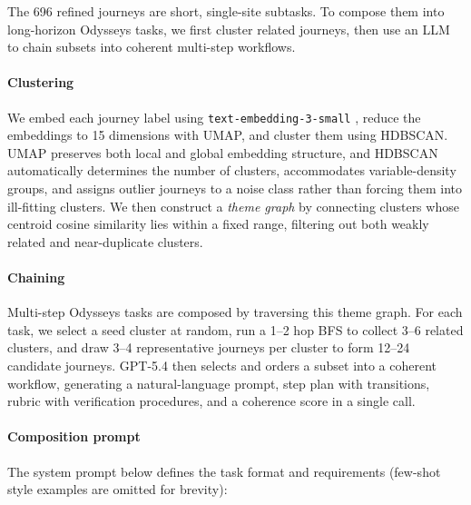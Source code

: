 \documentclass{article}
\theoremstyle{plain}
\theoremstyle{definition}
\theoremstyle{remark}
\def\odysseys{Odysseys\xspace}
\begin{document}
The 696 refined journeys are short, single-site subtasks. To compose them into long-horizon \odysseys tasks, we first cluster related journeys, then use an LLM to chain subsets into coherent multi-step workflows.

\paragraph{Clustering} We embed each journey label using \texttt{text-embedding-3-small} \citep{openai_text_embedding_3_small}, reduce the embeddings to 15 dimensions with UMAP, and cluster them using HDBSCAN. UMAP preserves both local and global embedding structure, and HDBSCAN automatically determines the number of clusters, accommodates variable-density groups, and assigns outlier journeys to a noise class rather than forcing them into ill-fitting clusters. We then construct a \textit{theme graph} by connecting clusters whose centroid cosine similarity lies within a fixed range, filtering out both weakly related and near-duplicate clusters.

\paragraph{Chaining} Multi-step \odysseys tasks are composed by traversing this theme graph. For each task, we select a seed cluster at random, run a 1--2 hop BFS to collect 3--6 related clusters, and draw 3--4 representative journeys per cluster to form 12--24 candidate journeys. GPT-5.4 then selects and orders a subset into a coherent workflow, generating a natural-language prompt, step plan with transitions, rubric with verification procedures, and a coherence score in a single call.

\paragraph{Composition prompt} The system prompt below defines the task format and requirements (few-shot style examples are omitted for brevity):
\end{document}
